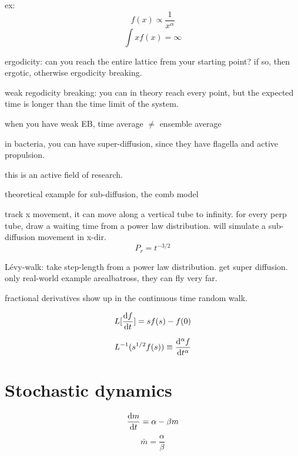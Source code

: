 \documentclass{article}
\begin{document}
ex: 
\begin{equation}
	f(x) \propto \frac{1}{x^\alpha}
\end{equation}
\begin{equation}
	\int xf(x) = \infty
\end{equation}

ergodicity: can you reach the entire lattice frem your starting point? if so, then ergotic, otherwise ergodicity breaking. 

weak regodicity breaking: you can in theory reach every point, but the expected time is longer than the time limit of the system. 

when you have weak EB, time average $\neq $ ensemble average

in bacteria, you can have super-diffusion, since they have flagella and active propulsion. 

this is an active field of research. 


theoretical example for sub-diffusion, the comb model

track x movement, it can move along a vertical tube to infinity. for every perp tube, draw a waiting time from a power law distribution. will simulate a sub-diffusion movement in x-dir. 
\begin{equation}
	P_r = t ^{-3/2}
\end{equation}

Lévy-walk: take step-length from a power law distribution. get super diffusion. only real-world example arealbatross, they can fly very far. 


fractional derivatives show up in the continuous time random walk. 


\begin{equation}
	L[\dv{f}{t}] = sf(s) - f(0)
\end{equation}

\begin{equation}
	L^{-1}(s^{1/2}f(s)) \equiv \dv [\alpha ]{f}{t}
\end{equation}








\section{Stochastic dynamics}

\begin{equation}
	\dv {m}{t} = \alpha - \beta m
\end{equation}
\begin{equation}
	\bar m =  \frac{\alpha }{\beta}
\end{equation}
\end{document}

